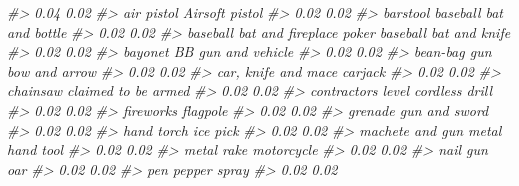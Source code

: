 \documentclass[
  12pt,
]{book}
\newenvironment{Shaded}{\begin{snugshade}}{\end{snugshade}}
\newcommand{\CommentTok}[1]{\textcolor[rgb]{0.56,0.35,0.01}{\textit{#1}}}
\begin{document}
\begin{Shaded}
\begin{Highlighting}[]
\CommentTok{\#>                             0.04                             0.02 }
\CommentTok{\#>                       air pistol                   Airsoft pistol }
\CommentTok{\#>                             0.02                             0.02 }
\CommentTok{\#>                         barstool          baseball bat and bottle }
\CommentTok{\#>                             0.02                             0.02 }
\CommentTok{\#> baseball bat and fireplace poker           baseball bat and knife }
\CommentTok{\#>                             0.02                             0.02 }
\CommentTok{\#>                          bayonet               BB gun and vehicle }
\CommentTok{\#>                             0.02                             0.02 }
\CommentTok{\#>                     bean{-}bag gun                    bow and arrow }
\CommentTok{\#>                             0.02                             0.02 }
\CommentTok{\#>              car, knife and mace                          carjack }
\CommentTok{\#>                             0.02                             0.02 }
\CommentTok{\#>                         chainsaw              claimed to be armed }
\CommentTok{\#>                             0.02                             0.02 }
\CommentTok{\#>               contractor\textquotesingle{}s level                   cordless drill }
\CommentTok{\#>                             0.02                             0.02 }
\CommentTok{\#>                        fireworks                         flagpole }
\CommentTok{\#>                             0.02                             0.02 }
\CommentTok{\#>                          grenade                    gun and sword }
\CommentTok{\#>                             0.02                             0.02 }
\CommentTok{\#>                       hand torch                         ice pick }
\CommentTok{\#>                             0.02                             0.02 }
\CommentTok{\#>                  machete and gun                  metal hand tool }
\CommentTok{\#>                             0.02                             0.02 }
\CommentTok{\#>                       metal rake                       motorcycle }
\CommentTok{\#>                             0.02                             0.02 }
\CommentTok{\#>                         nail gun                              oar }
\CommentTok{\#>                             0.02                             0.02 }
\CommentTok{\#>                              pen                     pepper spray }
\CommentTok{\#>                             0.02                             0.02 }

\end{Highlighting}
\end{Shaded}
\end{document}
